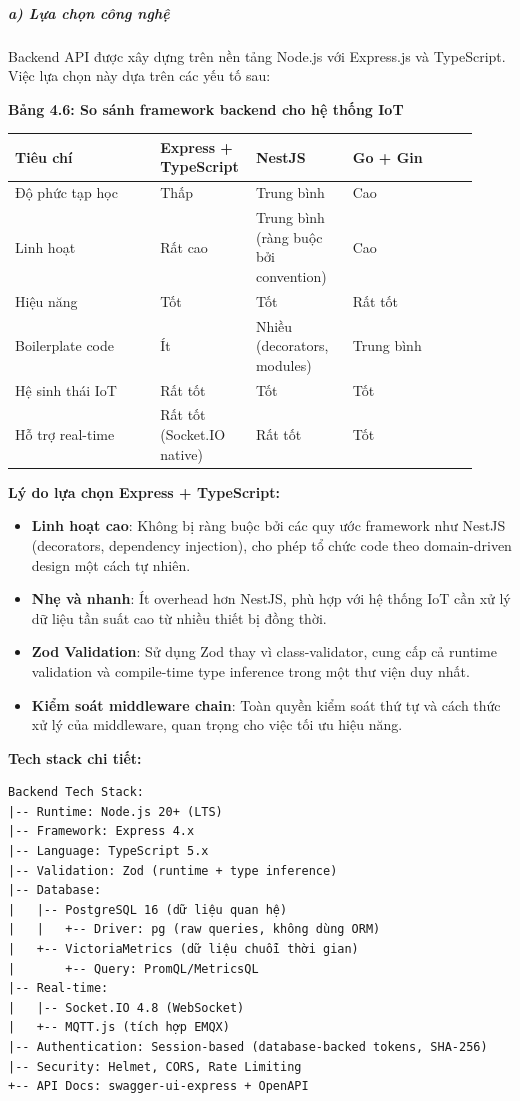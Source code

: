 \documentclass[13pt,a4paper]{extarticle}
\newcounter{none} %
\newcommand{\thesislongtableorignewline}{}
\let\thesislongtableorignewline\\
\renewcommand{\\}{\thesislongtableorignewline\hline}%
\let\\\thesislongtableorignewline
\newcommand{\thesistabletitle}[1]{%
  \begin{center}\textbf{#1}\end{center}%
}
\providecommand{\tightlist}{%
  \setlength{\itemsep}{0pt}\setlength{\parskip}{0pt}}
\begin{document}
\subparagraph{a) Lựa chọn công
nghệ}\label{a-lux1ef1a-chux1ecdn-cuxf4ng-nghux1ec7-1}

Backend API được xây dựng trên nền tảng Node.js với Express.js và
TypeScript. Việc lựa chọn này dựa trên các yếu tố sau:

\thesistabletitle{Bảng 4.6: So sánh framework backend cho hệ thống IoT}

{\def\LTcaptype{none} %
\begin{longtable}{|p{0.30\linewidth}|p{0.16\linewidth}|p{0.20\linewidth}|p{0.26\linewidth}|}
\hline \textbf{Tiêu chí} & \textbf{Express + TypeScript} & \textbf{NestJS} & \textbf{Go + Gin} \\
\hline
\endhead
\hline
\endlastfoot
Độ phức tạp học & Thấp & Trung bình & Cao \\
Linh hoạt & Rất cao & Trung bình (ràng buộc bởi convention) & Cao \\
Hiệu năng & Tốt & Tốt & Rất tốt \\
Boilerplate code & Ít & Nhiều (decorators, modules) & Trung bình \\
Hệ sinh thái IoT & Rất tốt & Tốt & Tốt \\
Hỗ trợ real-time & Rất tốt (Socket.IO native) & Rất tốt & Tốt \\
\end{longtable}
}

\textbf{Lý do lựa chọn Express + TypeScript:}

\begin{itemize}
\tightlist
\item
  \textbf{Linh hoạt cao}: Không bị ràng buộc bởi các quy ước framework
  như NestJS (decorators, dependency injection), cho phép tổ chức code
  theo domain-driven design một cách tự nhiên.
\item
  \textbf{Nhẹ và nhanh}: Ít overhead hơn NestJS, phù hợp với hệ thống
  IoT cần xử lý dữ liệu tần suất cao từ nhiều thiết bị đồng thời.
\item
  \textbf{Zod Validation}: Sử dụng Zod thay vì class-validator, cung cấp
  cả runtime validation và compile-time type inference trong một thư
  viện duy nhất.
\item
  \textbf{Kiểm soát middleware chain}: Toàn quyền kiểm soát thứ tự và
  cách thức xử lý của middleware, quan trọng cho việc tối ưu hiệu năng.
\end{itemize}

\textbf{Tech stack chi tiết:}

\begin{verbatim}
Backend Tech Stack:
|-- Runtime: Node.js 20+ (LTS)
|-- Framework: Express 4.x
|-- Language: TypeScript 5.x
|-- Validation: Zod (runtime + type inference)
|-- Database:
|   |-- PostgreSQL 16 (dữ liệu quan hệ)
|   |   +-- Driver: pg (raw queries, không dùng ORM)
|   +-- VictoriaMetrics (dữ liệu chuỗi thời gian)
|       +-- Query: PromQL/MetricsQL
|-- Real-time:
|   |-- Socket.IO 4.8 (WebSocket)
|   +-- MQTT.js (tích hợp EMQX)
|-- Authentication: Session-based (database-backed tokens, SHA-256)
|-- Security: Helmet, CORS, Rate Limiting
+-- API Docs: swagger-ui-express + OpenAPI
\end{verbatim}
\end{document}
